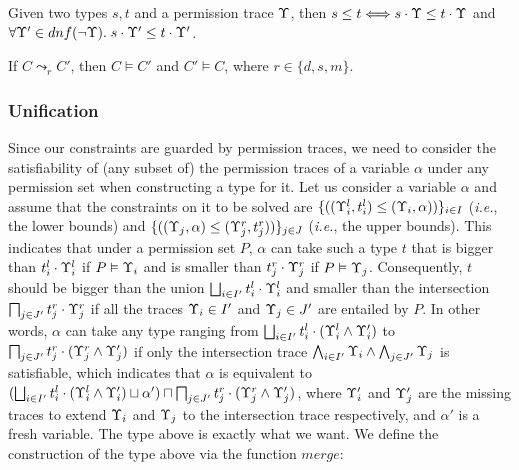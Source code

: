 {{{\begin{lemma}\label{lem:tracesub1}
Given two types $s,t$ and a permission trace $\Upsilon$, then
$s\leq t\Longleftrightarrow s\cdot\Upsilon \leq t\cdot\Upsilon$ and $\forall \Upsilon' \in dnf(\neg\Upsilon).\; s\cdot \Upsilon' \leq t\cdot\Upsilon'$.
\end{lemma}


\begin{lemma}\label{lem:consolcorrect}
If $C\leadsto_{r} C'$, then $C\vDash C'$ and $C' \vDash C$, where $r\in \{d,s,m\}$.
\end{lemma}


\subsubsection{\textbf{Unification}}
Since our constraints are guarded by permission traces, we need to consider the satisfiability of (any subset of) the permission traces of a variable $\alpha$ under any permission set when constructing a type for it.
Let us consider a variable $\alpha$ and assume that the constraints on it to be solved are
 $\{((\Upsilon_i^l,t_i^l)\leq(\Upsilon_i,\alpha))\}_{i\in I}$ (\emph{i.e.}, the lower bounds) and
  $\{((\Upsilon_j,\alpha)\leq(\Upsilon_j^r,t_j^r))\}_{j\in J}$ (\emph{i.e.}, the upper bounds).
This indicates that under a permission set $P$, $\alpha$ can take such a type $t$ that is bigger than $t_i^l\cdot\Upsilon_i^l$ if $P\vDash \Upsilon_i$ and is smaller than $t_j^r\cdot\Upsilon_j^r$ if $P\vDash \Upsilon_j$.
Consequently, $t$ should be bigger than the union $\bigsqcup_{i\in I'} t_i^l\cdot\Upsilon_i^l$ and smaller than the intersection $\bigsqcap_{j\in J'} t_j^r\cdot\Upsilon_j^r$ if all the traces $\Upsilon_i \in I'$ and $\Upsilon_j \in J'$ are entailed by $P$.
In other words, $\alpha$ can take any type ranging from $\bigsqcup_{i\in I'} t_i^l\cdot(\Upsilon_i^l\wedge \Upsilon'_i)$ to $\bigsqcap_{j\in J'} t_j^r\cdot(\Upsilon_j^r\wedge\Upsilon'_j)$ if only the intersection trace $\bigwedge_{i \in I'} \Upsilon_i \wedge \bigwedge_{j\in J'}\Upsilon_j$ is satisfiable, which indicates that $\alpha$ is equivalent to $(\bigsqcup_{i\in I'} t_i^l\cdot(\Upsilon_i^l\wedge \Upsilon'_i) \sqcup \alpha' )\sqcap \bigsqcap_{j\in J'} t_j^r\cdot(\Upsilon_j^r\wedge \Upsilon'_j)$, where $\Upsilon'_i$ and $\Upsilon'_j$ are the missing traces to extend  $\Upsilon_i$ and $\Upsilon_j$ to the intersection trace respectively, and $\alpha'$ is a fresh variable.
The type above is exactly what we want.
We define the construction of the type above via the function $merge$:
{\myeqsize
\begin{algorithmic}

\end{algorithmic}}}}}
